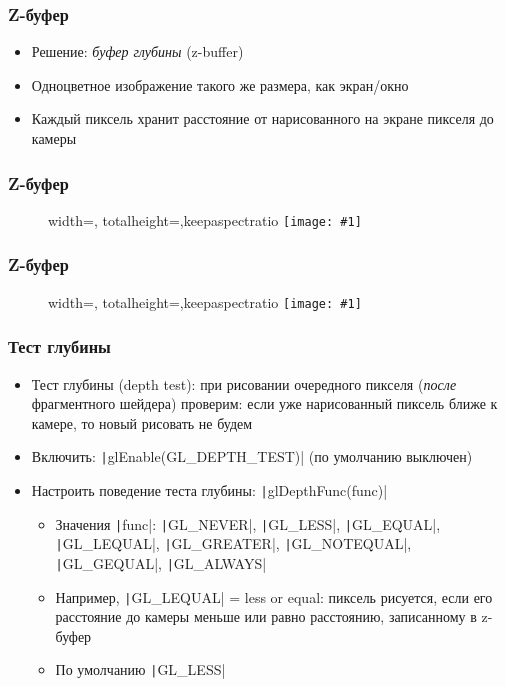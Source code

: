 \documentclass[10pt]{beamer}
\newcommand{\slideimage}[1]{
  \begin{figure}
    \begin{adjustbox}{width=\textwidth, totalheight=\textheight-2\baselineskip-2\baselineskip,keepaspectratio}
      \texttt{[image: \#1]}
    \end{adjustbox}
  \end{figure}
}
\begin{document}
\begin{frame}[fragile]
\frametitle{Z-буфер}
\begin{itemize}
\item Решение: \textit{буфер глубины} (z-buffer)
\pause
\item Одноцветное изображение такого же размера, как экран/окно
\pause
\item Каждый пиксель хранит расстояние от нарисованного на экране пикселя до камеры
\end{itemize}
\end{frame}

\begin{frame}
\frametitle{Z-буфер}
\slideimage{gta5_zbuffer.jpg}
\end{frame}

\begin{frame}
\frametitle{Z-буфер}
\slideimage{gta5.jpg}
\end{frame}

\begin{frame}[fragile]
\frametitle{Тест глубины}
\begin{itemize}
\item Тест глубины (depth test): при рисовании очередного пикселя (\textit{после} фрагментного шейдера) проверим: если уже нарисованный пиксель ближе к камере, то новый рисовать не будем
\pause
\item Включить: \texttt|glEnable(GL_DEPTH_TEST)| (по умолчанию выключен)
\pause
\item Настроить поведение теста глубины: \texttt|glDepthFunc(func)|
\begin{itemize}
\item Значения \texttt|func|: \texttt|GL_NEVER|, \texttt|GL_LESS|, \texttt|GL_EQUAL|, \texttt|GL_LEQUAL|, \texttt|GL_GREATER|, \texttt|GL_NOTEQUAL|, \texttt|GL_GEQUAL|, \texttt|GL_ALWAYS|
\pause
\item Например, \texttt|GL_LEQUAL| = less or equal: пиксель рисуется, если его расстояние до камеры меньше или равно расстоянию, записанному в z-буфер
\pause
\item По умолчанию \texttt|GL_LESS|
\end{itemize}
\end{itemize}
\end{frame}
\end{document}
